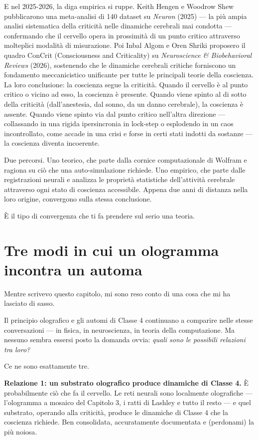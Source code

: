 \documentclass[11pt, twoside, openright]{book}
\begin{document}
E nel 2025-2026, la diga empirica si ruppe. Keith Hengen e Woodrow Shew pubblicarono una meta-analisi di 140 dataset su \textit{Neuron} (2025) --- la più ampia analisi sistematica della criticità nelle dinamiche cerebrali mai condotta --- confermando che il cervello opera in prossimità di un punto critico attraverso molteplici modalità di misurazione. Poi Inbal Algom e Oren Shriki proposero il quadro ConCrit (Consciousness and Criticality) su \textit{Neuroscience \& Biobehavioral Reviews} (2026), sostenendo che le dinamiche cerebrali critiche forniscono un fondamento meccanicistico unificante per tutte le principali teorie della coscienza. La loro conclusione: la coscienza segue la criticità. Quando il cervello è al punto critico o vicino ad esso, la coscienza è presente. Quando viene spinto al di sotto della criticità (dall'anestesia, dal sonno, da un danno cerebrale), la coscienza è assente. Quando viene spinto via dal punto critico nell'altra direzione --- collassando in una rigida ipersincronia in lock-step o esplodendo in un caos incontrollato, come accade in una crisi e forse in certi stati indotti da sostanze --- la coscienza diventa incoerente.

Due percorsi. Uno teorico, che parte dalla cornice computazionale di Wolfram e ragiona su ciò che una auto-simulazione richiede. Uno empirico, che parte dalle registrazioni neurali e analizza le proprietà statistiche dell'attività cerebrale attraverso ogni stato di coscienza accessibile. Appena due anni di distanza nella loro origine, convergono sulla stessa conclusione.

È il tipo di convergenza che ti fa prendere sul serio una teoria.

\section*{Tre modi in cui un ologramma incontra un automa}

Mentre scrivevo questo capitolo, mi sono reso conto di una cosa che mi ha lasciato di sasso.

Il principio olografico e gli automi di Classe 4 continuano a comparire nelle stesse conversazioni --- in fisica, in neuroscienza, in teoria della computazione. Ma nessuno sembra essersi posto la domanda ovvia: \textit{quali sono le possibili relazioni tra loro?}

Ce ne sono esattamente tre.

\textbf{Relazione 1: un substrato olografico produce dinamiche di Classe 4.} È probabilmente ciò che fa il cervello. Le reti neurali sono localmente olografiche --- l'ologramma a mosaico del Capitolo 3, i ratti di Lashley e tutto il resto --- e quel substrato, operando alla criticità, produce le dinamiche di Classe 4 che la coscienza richiede. Ben consolidata, accuratamente documentata e (perdonami) la più noiosa.
\end{document}
